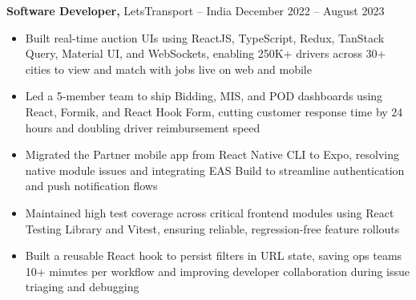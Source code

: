 \documentclass[11pt]{article}       %
\begin{document}
\textbf{Software Developer,} {LetsTransport} -- India \hfill December 2022 -- August 2023 \\
\vspace{-9pt}
\begin{itemize}
    \item Built real-time auction UIs using ReactJS, TypeScript, Redux, TanStack Query, Material UI, and WebSockets, enabling 250K+ drivers across 30+ cities to view and match with jobs live on web and mobile
    \item Led a 5-member team to ship Bidding, MIS, and POD dashboards using React, Formik, and React Hook Form, cutting customer response time by 24 hours and doubling driver reimbursement speed
    \item	Migrated the Partner mobile app from React Native CLI to Expo, resolving native module issues and integrating EAS Build to streamline authentication and push notification flows
    \item	Maintained high test coverage across critical frontend modules using React Testing Library and Vitest, ensuring reliable, regression-free feature rollouts
    \item	Built a reusable React hook to persist filters in URL state, saving ops teams 10+ minutes per workflow and improving developer collaboration during issue triaging and debugging
\end{itemize}
\vspace{10pt}
\end{document}
